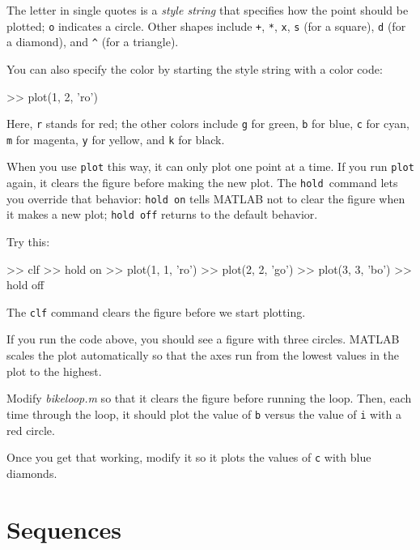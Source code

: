The letter in single quotes is a \emph{style string} that specifies how the
point should be plotted;  \lstinline{o} indicates a circle.
Other shapes include \lstinline{+},
\lstinline{*},
\lstinline{x},
\lstinline{s} (for a square),
\lstinline{d} (for a diamond), and
\lstinline{^} (for a triangle).

You can also specify the color by starting the style string with a color code:

\begin{code}
>> plot(1, 2, 'ro')
\end{code}

Here, \lstinline{r} stands for red; the other colors include \lstinline{g} for green, \lstinline{b} for blue, \lstinline{c} for cyan, \lstinline{m} for magenta, \lstinline{y} for yellow, and \lstinline{k} for black.

When you use \lstinline{plot} this way, it can only plot one point at a
time.  If you run \lstinline{plot} again, it clears the figure before making
the new plot.  The \lstinline{hold}~command lets you override that behavior:
\lstinline{hold on} tells MATLAB not to clear the figure when it makes a new
plot; \lstinline{hold off} returns to the default behavior.


Try this:

\begin{code}
>> clf
>> hold on
>> plot(1, 1, 'ro')
>> plot(2, 2, 'go')
>> plot(3, 3, 'bo')
>> hold off
\end{code}

The \lstinline{clf} command clears the figure before we start plotting.


If you run the code above, you should see a figure with three circles.  MATLAB scales the plot automatically so that the axes run from the lowest values in the plot to the highest.

\begin{ex}
Modify \emph{bike\textunderscore loop.m} so that it clears the figure before running the loop.  Then, each time through the loop, it should plot the value of \lstinline{b} versus the value of \lstinline{i} with a red circle.

Once you get that working, modify it so it plots the values of \lstinline{c} with blue diamonds.
\end{ex}


\section{Sequences}

